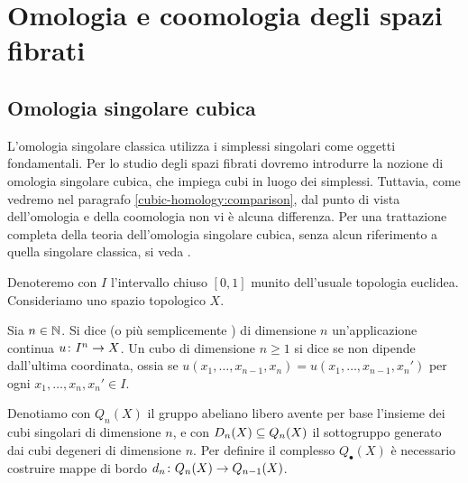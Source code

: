 \chapter{Omologia e coomologia degli spazi fibrati}
\label{ch:homology-and-cohomology-of-fibrations}
\section{Omologia singolare cubica}

L'omologia singolare classica utilizza i simplessi singolari come oggetti fondamentali. Per lo studio degli spazi fibrati dovremo introdurre la nozione di omologia singolare cubica, che impiega cubi in luogo dei simplessi. Tuttavia, come vedremo nel paragrafo \ref{cubic-homology:comparison}, dal punto di vista dell'omologia e della coomologia non vi è alcuna differenza. Per una trattazione completa della teoria dell'omologia singolare cubica, senza alcun riferimento a quella singolare classica, si veda \cite{massey}.

Denoteremo con \(I\) l'intervallo chiuso \([0,1]\) munito dell'usuale topologia euclidea. Consideriamo uno spazio topologico \(X\).

\begin{definition}
Sia \(n\in\mathbb{N}\). Si dice  (o più semplicemente ) di dimensione \(n\) un'applicazione continua \(\map{u}{I^n}{X}\). Un cubo di dimensione \(n\ge 1\) si dice  se non dipende dall'ultima coordinata, ossia se \(u(x_1,\ldots,x_{n-1},x_n)=u(x_1,\ldots,x_{n-1},x_n')\) per ogni \(x_1,\ldots,x_n,x_n'\in I\).
\end{definition}

Denotiamo con \(Q_n(X)\) il gruppo abeliano libero avente per base l'insieme dei cubi singolari di dimensione \(n\), e con \(D_n(X)\subseteq Q_n(X)\) il sottogruppo generato dai cubi degeneri di dimensione \(n\). Per definire il complesso \(Q_\bullet(X)\) è necessario costruire mappe di bordo \(\map{d_n}{Q_n(X)}{Q_{n-1}(X)}\).

